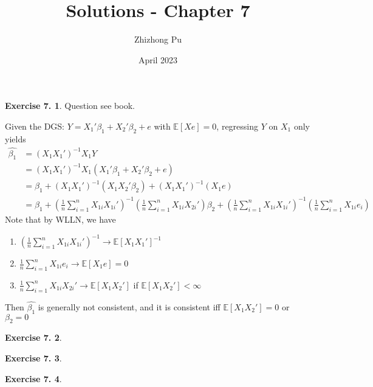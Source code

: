 \documentclass[12pt,letterpaper,reqno]{amsart}
\newcommand{\E}{\mathbb E}
\theoremstyle{plain}
\theoremstyle{definition}
\theoremstyle{definition}
\newtheorem{Exercise}{Exercise 7.}
\numberwithin{equation}{section}
\begin{document}
\author{Zhizhong Pu}
\title{Solutions - Chapter 7}
\date{April 2023}
\maketitle

\thispagestyle{empty}

\begin{Exercise} Question see book. 

   Given the DGS: $Y=X_1'\beta_1+X_2'\beta_2+e$ with $\E[Xe]=0$, regressing $Y$ on $X_1$ only yields 
   \[\begin{split}
     \hat{\beta_1} & = (X_1X_1')^{-1}X_1Y \\ 
    & = (X_1X_1')^{-1}X_1(X_1'\beta_1+X_2'\beta_2+e) \\ 
    & = \beta_1 + (X_1X_1')^{-1}(X_1X_2'\beta_2) + (X_1X_1')^{-1}(X_1e) \\
    & = \beta_1 + (\frac{1}{n} \sum_{i=1}^n X_{1i} X_{1i}')^{-1} (\frac{1}{n} \sum_{i=1}^n X_{1i} X_{2i}' )\beta_2 + (\frac{1}{n} \sum_{i=1}^n X_{1i} X_{1i}')^{-1} (\frac{1}{n} \sum_{i=1}^n X_{1i} e_i)
    \end{split}\]
   Note that by WLLN, we have 

   \begin{enumerate}
        \item $(\frac{1}{n} \sum_{i=1}^n X_{1i} X_{1i}')^{-1} \rightarrow \E[X_1X_1']^{-1}$
        
        \item $\frac{1}{n} \sum_{i=1}^n X_{1i} e_i \rightarrow \E[X_1e] = 0$
        
        \item $\frac{1}{n} \sum_{i=1}^n X_{1i} X_{2i}' \rightarrow \E[X_1X_2']$ if $\E[X_1X_2']<\infty$
        
   \end{enumerate}
   
   Then $\hat{\beta_1}$ is generally not consistent, and it is consistent iff $\E[X_1X_2'] = 0$ or $\beta_2 = 0$
    
\end{Exercise}

\begin{Exercise}\end{Exercise}

\begin{Exercise}\end{Exercise}

\begin{Exercise}\end{Exercise}
\end{document}
